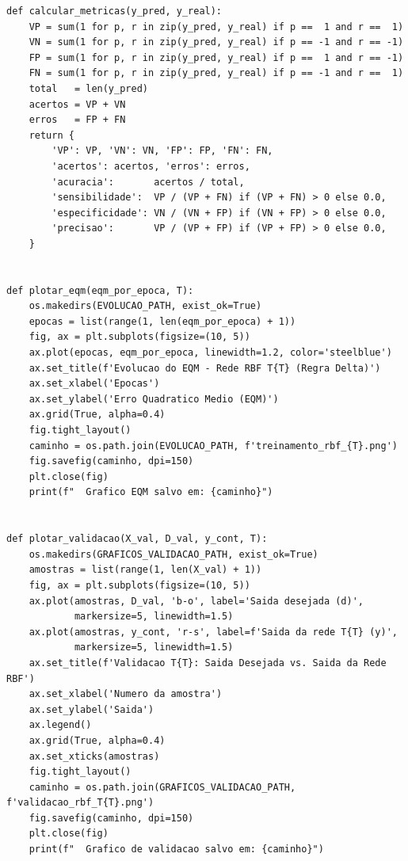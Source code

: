 \documentclass[article, 12pt, oneside, a4paper, section = TITLE, brazil]{abntex2}
\begin{document}
\begin{lstlisting}
def calcular_metricas(y_pred, y_real):
    VP = sum(1 for p, r in zip(y_pred, y_real) if p ==  1 and r ==  1)
    VN = sum(1 for p, r in zip(y_pred, y_real) if p == -1 and r == -1)
    FP = sum(1 for p, r in zip(y_pred, y_real) if p ==  1 and r == -1)
    FN = sum(1 for p, r in zip(y_pred, y_real) if p == -1 and r ==  1)
    total   = len(y_pred)
    acertos = VP + VN
    erros   = FP + FN
    return {
        'VP': VP, 'VN': VN, 'FP': FP, 'FN': FN,
        'acertos': acertos, 'erros': erros,
        'acuracia':       acertos / total,
        'sensibilidade':  VP / (VP + FN) if (VP + FN) > 0 else 0.0,
        'especificidade': VN / (VN + FP) if (VN + FP) > 0 else 0.0,
        'precisao':       VP / (VP + FP) if (VP + FP) > 0 else 0.0,
    }


def plotar_eqm(eqm_por_epoca, T):
    os.makedirs(EVOLUCAO_PATH, exist_ok=True)
    epocas = list(range(1, len(eqm_por_epoca) + 1))
    fig, ax = plt.subplots(figsize=(10, 5))
    ax.plot(epocas, eqm_por_epoca, linewidth=1.2, color='steelblue')
    ax.set_title(f'Evolucao do EQM - Rede RBF T{T} (Regra Delta)')
    ax.set_xlabel('Epocas')
    ax.set_ylabel('Erro Quadratico Medio (EQM)')
    ax.grid(True, alpha=0.4)
    fig.tight_layout()
    caminho = os.path.join(EVOLUCAO_PATH, f'treinamento_rbf_{T}.png')
    fig.savefig(caminho, dpi=150)
    plt.close(fig)
    print(f"  Grafico EQM salvo em: {caminho}")


def plotar_validacao(X_val, D_val, y_cont, T):
    os.makedirs(GRAFICOS_VALIDACAO_PATH, exist_ok=True)
    amostras = list(range(1, len(X_val) + 1))
    fig, ax = plt.subplots(figsize=(10, 5))
    ax.plot(amostras, D_val, 'b-o', label='Saida desejada (d)',
            markersize=5, linewidth=1.5)
    ax.plot(amostras, y_cont, 'r-s', label=f'Saida da rede T{T} (y)',
            markersize=5, linewidth=1.5)
    ax.set_title(f'Validacao T{T}: Saida Desejada vs. Saida da Rede RBF')
    ax.set_xlabel('Numero da amostra')
    ax.set_ylabel('Saida')
    ax.legend()
    ax.grid(True, alpha=0.4)
    ax.set_xticks(amostras)
    fig.tight_layout()
    caminho = os.path.join(GRAFICOS_VALIDACAO_PATH, f'validacao_rbf_T{T}.png')
    fig.savefig(caminho, dpi=150)
    plt.close(fig)
    print(f"  Grafico de validacao salvo em: {caminho}")



\end{lstlisting}
\end{document}

